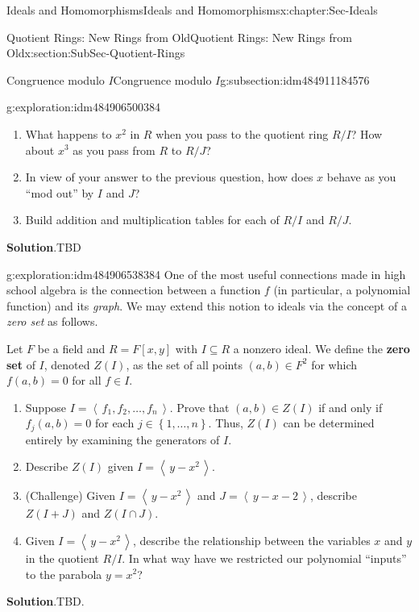 \documentclass[oneside,10pt,]{book}
\newcommand{\blocktitlefont}{\relax}
\newcommand{\terminology}[1]{\textbf{#1}}
\numberwithin{equation}{section}
\newcommand{\ideal}[1]{\left\langle\, #1 \,\right\rangle}
\newcommand{\set}[1]{\left\{ {#1} \right\}}
\begin{document}
\begin{chapterptx}{Ideals and Homomorphisms}{}{Ideals and Homomorphisms}{}{}{x:chapter:Sec-Ideals}
\begin{sectionptx}{Quotient Rings: New Rings from Old}{}{Quotient Rings: New Rings from Old}{}{}{x:section:SubSec-Quotient-Rings}
\begin{subsectionptx}{Congruence modulo \(I\)}{}{Congruence modulo \(I\)}{}{}{g:subsection:idm484911184576}
\begin{exploration}{}{g:exploration:idm484906500384}
\begin{enumerate}
\item{}What happens to \(x^2\) in \(R\) when you pass to the quotient ring \(R/I\)? How about \(x^3\) as you pass from \(R\) to \(R/J\)?%
\item{}In view of your answer to the previous question, how does \(x\) behave as you ``mod out'' by \(I\) and \(J\)?%
\item{}Build addition and multiplication tables for each of \(R/I\) and \(R/J\).%
\end{enumerate}
\par\smallskip%
\noindent\textbf{\blocktitlefont Solution}.\hypertarget{g:solution:idm484906538640}{}\quad{}TBD\end{exploration}
\begin{exploration}{}{g:exploration:idm484906538384}%
One of the most useful connections made in high school algebra is the connection between a function \(f\) (in particular, a polynomial function) and its \emph{graph}. We may extend this notion to ideals via the concept of a \emph{zero set} as follows.%
\par
Let \(F\) be a field and \(R = F[x,y]\) with \(I\subseteq R\) a nonzero ideal. We define the \terminology{zero set} of \(I\), denoted \(Z(I)\), as the set of all points \((a,b)\in F^2\) for which \(f(a,b)=0\) for all \(f\in I\).%
%
\begin{enumerate}
\item{}Suppose \(I = \ideal{f_1, f_2, \ldots, f_n}\). Prove that \((a,b)\in Z(I)\) if and only if \(f_j(a,b) = 0\) for each \(j\in \set{1,\ldots, n}\). Thus, \(Z(I)\) can be determined entirely by examining the generators of \(I\).%
\item{}Describe \(Z(I)\) given \(I = \ideal{y-x^2}\).%
\item{}(Challenge) Given \(I = \ideal{y-x^2}\) and \(J = \ideal{y-x-2}\), describe \(Z(I+J)\) and \(Z(I\cap J)\).%
\item{}Given \(I=\ideal{y-x^2}\), describe the relationship between the variables \(x\) and \(y\) in the quotient \(R/I\). In what way have we restricted our polynomial ``inputs'' to the parabola \(y = x^2\)?%
\end{enumerate}
\par\smallskip%
\noindent\textbf{\blocktitlefont Solution}.\hypertarget{g:solution:idm484906525408}{}\quad{}TBD.\end{exploration}
\end{subsectionptx}
%
%
\typeout{************************************************}

\end{sectionptx}
\end{chapterptx}
\end{document}

